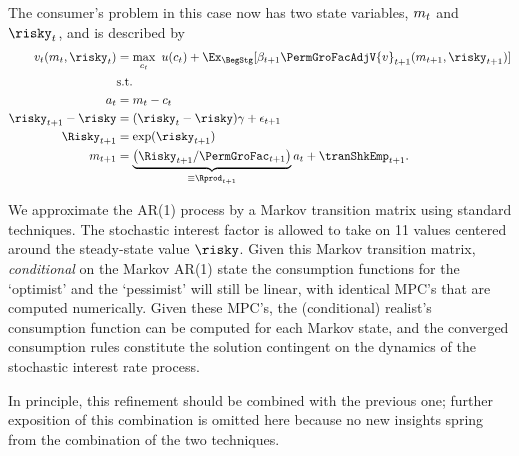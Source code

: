 \documentclass[SolvingMicroDSOPs]{subfiles}
\begin{document}
The consumer's problem in this case now has two state variables, $m_{t}$ and $\risky_{\prd}$, and
is described by
\begin{equation}\begin{gathered}\begin{aligned}
      \vFunc_{\prd}(m_{\prd},\risky_{\prd})  & = \max_{{c}_{\prd}} ~ \uFunc(c_{\prd})+
      \Ex_{\BegStg}[{\DiscFac}_{\prd+1}\PermGroFacAdjV{\vFunc}_{\prd+1}(m_{\prd+1},\risky_{\prd+1})] \label{vNormedRisky}
      \\         & \text{s.t.}   \nonumber \\
      a_{\prd}    & = m_{\prd}-c_{\prd} \nonumber
      \\      \risky_{\prd+1}-\risky  & = (\risky_{\prd}-\risky)\gamma + \epsilon_{\prd+1} \notag
      \\      \Risky_{\prd+1}  & = \exp(\risky_{\prd+1}) \notag
      \\      m_{\prd+1}  & = \underbrace{\left(\Risky_{\prd+1}/\PermGroFac_{\prd+1}\right)}_{\equiv \Rprod_{\prd+1}}a_{\prd}+\tranShkEmp_{\prd+1} \nonumber.
    \end{aligned}\end{gathered}\end{equation}


We approximate the AR(1) process by a Markov transition matrix using standard techniques.  The stochastic interest factor is allowed to take
on 11 values centered around the steady-state value $\risky$.  Given this Markov transition matrix, \textit{conditional} on the Markov AR(1) state the consumption functions for the `optimist' and the `pessimist' will still be linear,
with identical MPC's that are computed numerically.  Given these MPC's, the (conditional) realist's consumption function can be computed for each Markov state, and the converged consumption rules constitute the solution contingent on the dynamics of the stochastic
interest rate process.

In principle, this refinement should be combined with the previous one;
further exposition of this combination is omitted here because no new
insights spring from the combination of the two techniques.



\hypertarget{imposing-artificial-borrowing-constraints}{}
\end{document}
